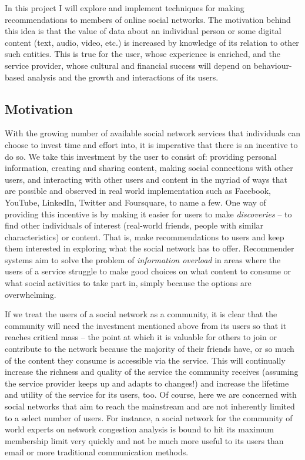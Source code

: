 In this project I will explore and implement techniques for making 
recommendations to members of online social networks. The motivation behind 
this idea is that the value of data about an individual person or some digital 
content (text, audio, video, etc.) is increased by knowledge of its relation to 
other such entities. This is true for the user, whose experience is enriched, 
and the service provider, whose cultural and financial success will depend on 
behaviour-based analysis and the growth and interactions of its users.

\subsection*{Motivation}

With the growing number of available social network services that individuals 
can choose to invest time and effort into, it is imperative that there is an 
incentive to do so. We take this investment by the user to consist of: 
providing personal information, creating and sharing content, making social 
connections with other users, and interacting with other users and content in 
the myriad of ways that are possible and observed in real world implementation 
such as Facebook, YouTube, LinkedIn, Twitter and Foursquare, to name a few. One 
way of providing this incentive is by making it easier for users to make 
\emph{discoveries} -- to find other individuals of interest (real-world 
friends, people with similar characteristics) or content. That is, make 
recommendations to users and keep them interested in exploring what the social 
network has to offer. Recommender systems aim to solve the problem of 
\emph{information overload} in areas where the users of a service struggle to 
make good choices on what content to consume or what social activities to take 
part in, simply because the options are overwhelming.

If we treat the users of a social network as a community, it is clear that the 
community will need the investment mentioned above from its users so that it 
reaches critical mass -- the point at which it is valuable for others to join 
or contribute to the network because the majority of their friends have, or so 
much of the content they consume is accessible via the service. This will 
continually increase the richness and quality of the service the community 
receives (assuming the service provider keeps up and adapts to changes!) and 
increase the lifetime and utility of the service for its users, too. Of course, 
here we are concerned with social networks that aim to reach the mainstream and 
are not inherently limited to a select number of users. For instance, a social 
network for the community of world experts on network congestion analysis is 
bound to hit its maximum membership limit very quickly and not be much more 
useful to its users than email or more traditional communication methods.

